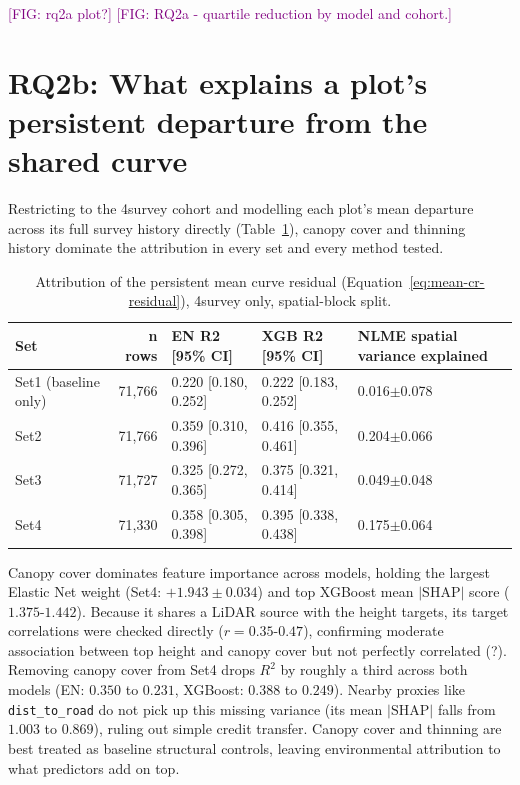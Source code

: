 \documentclass[logo,msc,ai]{infthesis}           %
\newcommand{\fig}[1]{\textcolor{purple}{[FIG: #1]}}
\begin{document}
\fig{rq2a plot?}
\fig{RQ2a - quartile reduction by model and cohort.}



\section{RQ2b: What explains a plot's persistent departure from the shared curve}

Restricting to the 4survey cohort and modelling each plot's mean departure across its
full survey history directly (Table~\ref{tab:results-rq2b}), canopy cover and thinning
history dominate the attribution in every set and every method tested.

\begin{table}[!htbp]
\centering
\scriptsize
\renewcommand{\arraystretch}{1.2}
\begin{tabular}{lrlll}
\toprule
Set & n rows & EN R2 [95\% CI] & XGB R2 [95\% CI] & NLME spatial variance explained \\
\midrule
Set1 (baseline only) & 71{,}766 & 0.220 [0.180, 0.252] & 0.222 [0.183, 0.252] & 0.016$\pm$0.078 \\
Set2 & 71{,}766 & 0.359 [0.310, 0.396] & 0.416 [0.355, 0.461] & 0.204$\pm$0.066 \\
Set3 & 71{,}727 & 0.325 [0.272, 0.365] & 0.375 [0.321, 0.414] & 0.049$\pm$0.048 \\
Set4 & 71{,}330 & 0.358 [0.305, 0.398] & 0.395 [0.338, 0.438] & 0.175$\pm$0.064 \\
\bottomrule
\end{tabular}
\caption{Attribution of the persistent mean curve residual (Equation~\ref{eq:mean-cr-residual}),
4survey only, spatial-block split.}
\label{tab:results-rq2b}
\end{table}

Canopy cover dominates feature importance across models, holding the largest Elastic Net weight (Set4: $+1.943 \pm 0.034$) and top XGBoost mean $\vert{}\text{SHAP}\vert{}$ score ($1.375\text{-}1.442$). Because it shares a LiDAR source with the height targets, its target correlations were checked directly ($r = 0.35\text{-}0.47$), confirming moderate association between top height and canopy cover but not perfectly correlated (?). Removing canopy cover from Set4 drops $R^2$ by roughly a third across both models (EN: $0.350$ to $0.231$, XGBoost: $0.388$ to $0.249$). Nearby proxies like \texttt{dist\_to\_road} do not pick up this missing variance (its mean $\vert{}\text{SHAP}\vert{}$ falls from $1.003$ to $0.869$), ruling out simple credit transfer. Canopy cover and thinning are best treated as baseline structural controls, leaving environmental attribution to what predictors add on top.
\end{document}
